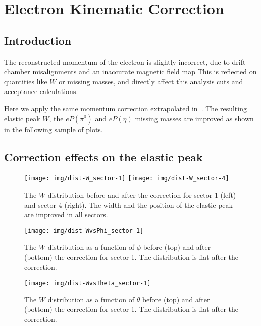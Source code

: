 \section{Electron Kinematic Correction}

\subsection{Introduction}

The reconstructed momentum of the electron is slightly incorrect, due to
drift chamber misalignments and an inaccurate magnetic field map
This is reflected on quantities like $W$ or missing masses, and directly affect this
analysis cuts and acceptance calculations.

Here we apply the same momentum correction extrapolated in~\cite{bib:pi0_Delta}.
The resulting elastic peak $W$, the $eP(\pi^0)$ and $eP(\eta)$ missing masses
are improved as shown in the following sample of plots.


\subsection{Correction effects on the elastic peak}

\begin{figure}[h]
    \centering
    \texttt{[image: img/dist-W\_sector-1]}
    \texttt{[image: img/dist-W\_sector-4]}
    \caption{The $W$ distribution before and after the correction for sector 1 (left) and
    sector 4 (right). The width and the position of the elastic peak are improved in all sectors.}
    \label{fig:dist-W_sector-1}
\end{figure}

\begin{figure}[h]
    \centering
    \texttt{[image: img/dist-WvsPhi\_sector-1]}
    \caption{The $W$ distribution as a function of $\phi$ before (top) and after (bottom) the correction
             for sector 1. The distribution is flat after the correction.}
    \label{fig:dist-WvsPhi_sector-1}
\end{figure}

\begin{figure}[h]
    \centering
    \texttt{[image: img/dist-WvsTheta\_sector-1]}
    \caption{The $W$ distribution as a function of $\theta$ before (top) and after (bottom) the correction
             for sector 1. The distribution is flat after the correction.}
    \label{fig:dist-WvsTheta_sector-1}
\end{figure}


